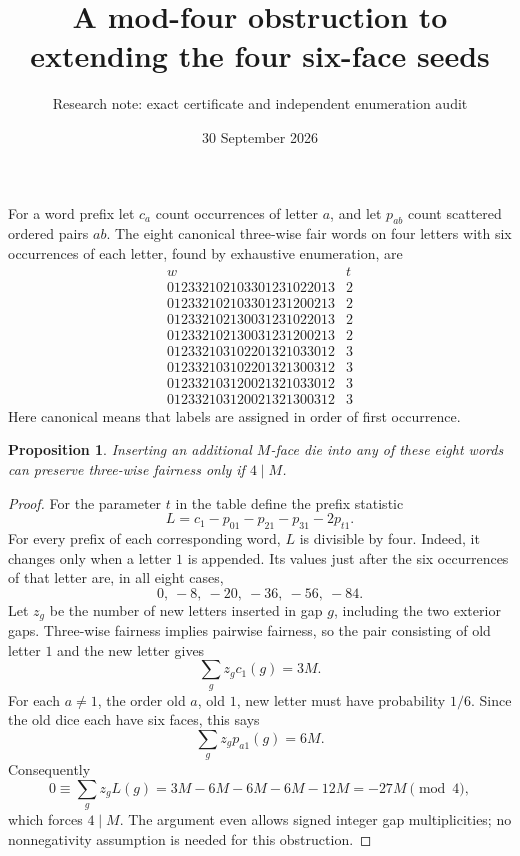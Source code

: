 \documentclass[11pt]{article}
\title{A mod-four obstruction to extending the four six-face seeds}
\author{Research note: exact certificate and independent enumeration audit}
\date{30 September 2026}
\newtheorem{proposition}{Proposition}
\begin{document}
\maketitle

For a word prefix let $c_a$ count occurrences of letter $a$, and let
$p_{ab}$ count scattered ordered pairs $ab$. The eight canonical
three-wise fair words on four letters with six occurrences of each
letter, found by exhaustive enumeration, are
\[
\begin{array}{c|c}
 w & t\\\hline
012332102103301231022013&2\\
012332102103301231200213&2\\
012332102130031231022013&2\\
012332102130031231200213&2\\
012332103102201321033012&3\\
012332103102201321300312&3\\
012332103120021321033012&3\\
012332103120021321300312&3
\end{array}
\]
Here canonical means that labels are assigned in order of first occurrence.

\begin{proposition}
Inserting an additional $M$-face die into any of these eight words can
preserve three-wise fairness only if $4\mid M$.
\end{proposition}
\begin{proof}
For the parameter $t$ in the table define the prefix statistic
\[
 L=c_1-p_{01}-p_{21}-p_{31}-2p_{t1}.
\]
For every prefix of each corresponding word, $L$ is divisible by four.
Indeed, it changes only when a letter $1$ is appended. Its values just
after the six occurrences of that letter are, in all eight cases,
\[
 0,\ -8,\ -20,\ -36,\ -56,\ -84.
\]
Let $z_g$ be the number of new letters inserted in gap $g$, including
the two exterior gaps. Three-wise fairness implies pairwise fairness,
so the pair consisting of old letter $1$ and the new letter gives
\[
 \sum_g z_g c_1(g)=3M.
\]
For each $a\ne1$, the order old $a$, old $1$, new letter must have
probability $1/6$. Since the old dice each have six faces, this says
\[
 \sum_g z_g p_{a1}(g)=6M.
\]
Consequently
\[
 0\equiv\sum_g z_g L(g)=3M-6M-6M-6M-12M=-27M\pmod4,
\]
which forces $4\mid M$. The argument even allows signed integer gap
multiplicities; no nonnegativity assumption is needed for this obstruction.
\end{proof}
\end{document}
